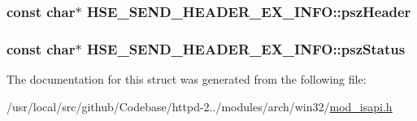 \subsubsection[{\texorpdfstring{psz\+Header}{pszHeader}}]{\setlength{\rightskip}{0pt plus 5cm}const char$\ast$ H\+S\+E\+\_\+\+S\+E\+N\+D\+\_\+\+H\+E\+A\+D\+E\+R\+\_\+\+E\+X\+\_\+\+I\+N\+F\+O\+::psz\+Header}\hypertarget{structHSE__SEND__HEADER__EX__INFO_a29ed9f43b879af18ca7b8e32181d10e4}{}\label{structHSE__SEND__HEADER__EX__INFO_a29ed9f43b879af18ca7b8e32181d10e4}
\subsubsection[{\texorpdfstring{psz\+Status}{pszStatus}}]{\setlength{\rightskip}{0pt plus 5cm}const char$\ast$ H\+S\+E\+\_\+\+S\+E\+N\+D\+\_\+\+H\+E\+A\+D\+E\+R\+\_\+\+E\+X\+\_\+\+I\+N\+F\+O\+::psz\+Status}\hypertarget{structHSE__SEND__HEADER__EX__INFO_a5ffd926750565b35c8e6f3d86cd99995}{}\label{structHSE__SEND__HEADER__EX__INFO_a5ffd926750565b35c8e6f3d86cd99995}


The documentation for this struct was generated from the following file\+:\begin{DoxyCompactItemize}
\item 
/usr/local/src/github/\+Codebase/httpd-\/2../modules/arch/win32/\hyperlink{mod__isapi_8h}{mod\+\_\+isapi.\+h}\end{DoxyCompactItemize}
